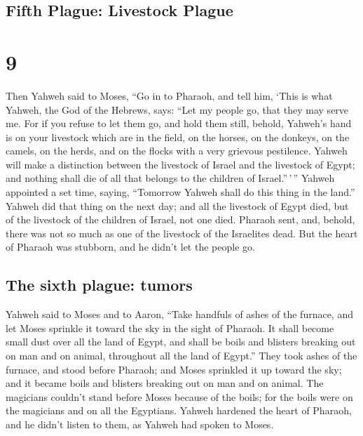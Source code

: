 \hypertarget{fifth-plague-livestock-plague}{%
\subsection{Fifth Plague: Livestock
Plague}\label{fifth-plague-livestock-plague}}

\hypertarget{section-8}{%
\section{9}\label{section-8}}

 Then Yahweh said to Moses, ``Go in to Pharaoh, and tell
him, `This is what Yahweh, the God of the Hebrews, says: ``Let my people
go, that they may serve me.  For if you refuse to let them
go, and hold them still,  behold, Yahweh's hand is on your
livestock which are in the field, on the horses, on the donkeys, on the
camels, on the herds, and on the flocks with a very grievous pestilence.
 Yahweh will make a distinction between the livestock of
Israel and the livestock of Egypt; and nothing shall die of all that
belongs to the children of Israel.''\,'\,''  Yahweh
appointed a set time, saying, ``Tomorrow Yahweh shall do this thing in
the land.''  Yahweh did that thing on the next day; and
all the livestock of Egypt died, but of the livestock of the children of
Israel, not one died.  Pharaoh sent, and, behold, there
was not so much as one of the livestock of the Israelites dead. But the
heart of Pharaoh was stubborn, and he didn't let the people go.

\hypertarget{the-sixth-plague-tumors}{%
\subsection{The sixth plague: tumors}\label{the-sixth-plague-tumors}}

 Yahweh said to Moses and to Aaron, ``Take handfuls of
ashes of the furnace, and let Moses sprinkle it toward the sky in the
sight of Pharaoh.  It shall become small dust over all the
land of Egypt, and shall be boils and blisters breaking out on man and
on animal, throughout all the land of Egypt.''  They took
ashes of the furnace, and stood before Pharaoh; and Moses sprinkled it
up toward the sky; and it became boils and blisters breaking out on man
and on animal.  The magicians couldn't stand before Moses
because of the boils; for the boils were on the magicians and on all the
Egyptians.  Yahweh hardened the heart of Pharaoh, and he
didn't listen to them, as Yahweh had spoken to Moses.


